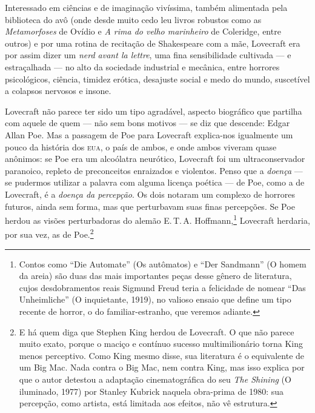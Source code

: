 Interessado em ciências e de imaginação vivíssima, também alimentada
pela biblioteca do avô (onde desde muito cedo leu livros robustos como
as \emph{Metamorfoses} de Ovídio e \emph{A rima do velho marinheiro} de
Coleridge, entre outros) e por uma rotina de recitação de Shakespeare
com a mãe, Lovecraft era por assim dizer um \emph{nerd avant la lettre},
uma fina sensibilidade cultivada --- e estraçalhada --- no alto da
sociedade industrial e mecânica, entre horrores psicológicos, ciência,
timidez erótica, desajuste social e medo do mundo, suscetível a colapsos
nervosos e insone.

Lovecraft não parece ter sido um tipo agradável, aspecto biográfico que
partilha com aquele de quem --- não sem bons motivos --- se diz que
descende: Edgar Allan Poe. Mas a passagem de Poe para
Lovecraft explica-nos igualmente um pouco da história dos \textsc{eua}, o país de
ambos, e onde ambos viveram quase anônimos: se Poe era um alcoólatra
neurótico, Lovecraft foi um ultraconservador paranoico, repleto de
preconceitos enraizados e violentos. Penso que a \emph{doença} --- se
pudermos utilizar a palavra com alguma licença poética --- de Poe, como a
de Lovecraft, é a \emph{doença da percepção}. Os dois notaram um complexo
de horrores futuros, ainda sem forma, mas que perturbavam suas finas
percepções. Se Poe herdou as visões perturbadoras do alemão E.\,T.\,A.
Hoffmann,\footnote{Contos como ``Die Automate'' (Os autômatos)
  e ``Der Sandmann'' (O homem da areia) são duas das mais importantes
  peças desse gênero de literatura, cujos desdobramentos reais Sigmund
  Freud teria a felicidade de nomear ``Das Unheimliche'' (O inquietante,
  1919), no valioso ensaio que define um tipo recente de horror, o do
  familiar-estranho, que veremos adiante.} Lovecraft herdaria, por sua
vez, as de Poe.\footnote{E há quem diga que Stephen King herdou de
  Lovecraft. O que não parece muito exato, porque o maciço e contínuo
  sucesso multimilionário torna King menos perceptivo. Como King mesmo
  disse, sua literatura é o equivalente de um Big Mac. Nada contra o Big
  Mac, nem contra King, mas isso explica por que o autor detestou a
  adaptação cinematográfica do seu \emph{The Shining} (O iluminado,
  1977) por Stanley Kubrick naquela obra-prima de 1980: sua percepção,
  como artista, está limitada aos efeitos, não vê estrutura.}

